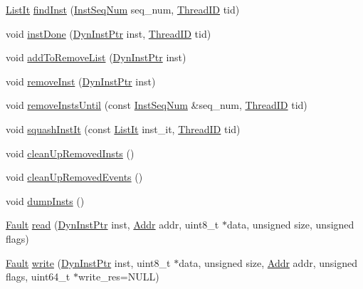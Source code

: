 \begin{DoxyCompactItemize}
\item 
\hyperlink{classInOrderCPU_a184cb829e22cc656acb41864f68f51ea}{ListIt} \hyperlink{classInOrderCPU_ac5d1854609f029a63ef2374408a1e499}{findInst} (\hyperlink{inst__seq_8hh_a258d93d98edaedee089435c19ea2ea2e}{InstSeqNum} seq\_\-num, \hyperlink{base_2types_8hh_ab39b1a4f9dad884694c7a74ed69e6a6b}{ThreadID} tid)
\item 
void \hyperlink{classInOrderCPU_a6b50b034099bb08ba363dfacf1ff4955}{instDone} (\hyperlink{classRefCountingPtr}{DynInstPtr} inst, \hyperlink{base_2types_8hh_ab39b1a4f9dad884694c7a74ed69e6a6b}{ThreadID} tid)
\item 
void \hyperlink{classInOrderCPU_a73933add1d7cb3776676ca829cc5e7ed}{addToRemoveList} (\hyperlink{classRefCountingPtr}{DynInstPtr} inst)
\item 
void \hyperlink{classInOrderCPU_ada01a7a7568c85b0f98b9f0946be8635}{removeInst} (\hyperlink{classRefCountingPtr}{DynInstPtr} inst)
\item 
void \hyperlink{classInOrderCPU_a79f7e36d4bd89fe4528b665a949a0023}{removeInstsUntil} (const \hyperlink{inst__seq_8hh_a258d93d98edaedee089435c19ea2ea2e}{InstSeqNum} \&seq\_\-num, \hyperlink{base_2types_8hh_ab39b1a4f9dad884694c7a74ed69e6a6b}{ThreadID} tid)
\item 
void \hyperlink{classInOrderCPU_a7a98b3e8dc082558dcf225e49588c70a}{squashInstIt} (const \hyperlink{classInOrderCPU_a184cb829e22cc656acb41864f68f51ea}{ListIt} inst\_\-it, \hyperlink{base_2types_8hh_ab39b1a4f9dad884694c7a74ed69e6a6b}{ThreadID} tid)
\item 
void \hyperlink{classInOrderCPU_a7bc351a2a79efb6dc9f88f8a6a2ed33c}{cleanUpRemovedInsts} ()
\item 
void \hyperlink{classInOrderCPU_a39643f756fba31f4194c22164dce65cd}{cleanUpRemovedEvents} ()
\item 
void \hyperlink{classInOrderCPU_a80587b4fe043bbe1995536cb3b361588}{dumpInsts} ()
\item 
\hyperlink{classRefCountingPtr}{Fault} \hyperlink{classInOrderCPU_ac48fe45ef23fddfa02b5136cda4c060e}{read} (\hyperlink{classRefCountingPtr}{DynInstPtr} inst, \hyperlink{base_2types_8hh_af1bb03d6a4ee096394a6749f0a169232}{Addr} addr, uint8\_\-t $\ast$data, unsigned size, unsigned flags)
\item 
\hyperlink{classRefCountingPtr}{Fault} \hyperlink{classInOrderCPU_aa5c5cc302819b0824df50495f6ffd319}{write} (\hyperlink{classRefCountingPtr}{DynInstPtr} inst, uint8\_\-t $\ast$data, unsigned size, \hyperlink{base_2types_8hh_af1bb03d6a4ee096394a6749f0a169232}{Addr} addr, unsigned flags, uint64\_\-t $\ast$write\_\-res=NULL)

\end{DoxyCompactItemize}

